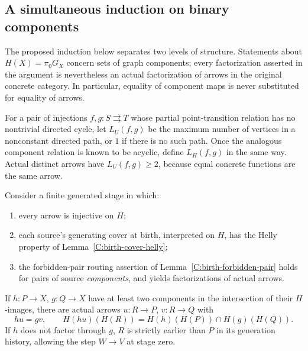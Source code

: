 \subsection{A simultaneous induction on binary components}

The proposed induction below separates two levels of structure.
Statements about $H(X)=\pi_0G_X$ concern sets of graph components;
every factorization asserted in the argument is nevertheless an
actual factorization of arrows in the original concrete category.
In particular, equality of component maps is never substituted for
equality of arrows.

For a pair of injections $f,g:S\rightrightarrows T$ whose partial
point-transition relation has no nontrivial directed cycle, let
$L_U(f,g)$ be the maximum number of vertices in a nonconstant
directed path, or $1$ if there is no such path. Once the analogous
component relation is known to be acyclic, define $L_H(f,g)$ in
the same way. Actual distinct arrows have $L_U(f,g)\geq2$,
because equal concrete functions are the same arrow.

\begin{lemma}
\label{C:component-two-intersection-draft}
Consider a finite generated stage in which:
\begin{enumerate}
\item every arrow is injective on $H$;
\item each source's generating cover at birth, interpreted on $H$,
has the Helly property of Lemma~\ref{C:birth-cover-helly};
\item the forbidden-pair routing assertion of
Lemma~\ref{C:birth-forbidden-pair} holds for pairs of source
\emph{components}, and yields factorizations of actual arrows.
\end{enumerate}
If $h:P\to X$, $g:Q\to X$ have at least two components in the
intersection of their $H$-images, there are actual arrows
$u:R\to P$, $v:R\to Q$ with
\[
 hu=gv,\qquad
 H(hu)(H(R))=H(h)(H(P))\cap H(g)(H(Q)).
 \tag{CI}\label{eq:component-intersection-span-draft}
\]
If $h$ does not factor through $g$, $R$ is strictly earlier than
$P$ in its generation history, allowing the step $W\to V$ at
stage zero.
\end{lemma}


